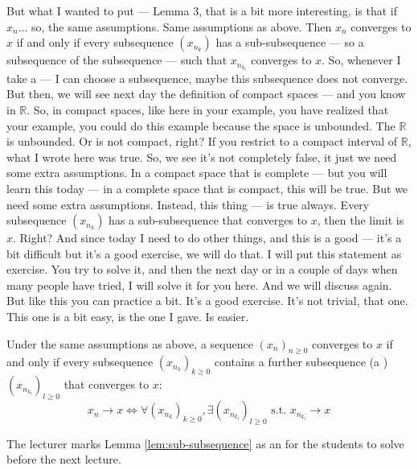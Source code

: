 \begin{spoken-clean}[00:13:41 - 00:15:50]
But what I wanted to put — Lemma 3, that is a bit more interesting, is that if $x_n$... so, the same assumptions. Same assumptions as above. Then $x_n$ converges to $x$ if and only if every subsequence $(x_{n_k})$ has a sub-subsequence — so a subsequence of the subsequence — such that $x_{n_{k_l}}$ converges to $x$. So, whenever I take a — I can choose a subsequence, maybe this subsequence does not converge. But then, we will see next day the definition of compact spaces — and you know in $\mathbb{R}$. So, in compact spaces, like here in your example, you have realized that your example, you could do this example because the space is unbounded. The $\mathbb{R}$ is unbounded. Or is not compact, right? If you restrict to a compact interval of $\mathbb{R}$, what I wrote here was true. So, we see it's not completely false, it just we need some extra assumptions. In a compact space that is complete — but you will learn this today — in a complete space that is compact, this will be true. But we need some extra assumptions. Instead, this thing — is true always. Every subsequence $(x_{n_k})$ has a sub-subsequence that converges to $x$, then the limit is $x$. Right? And since today I need to do other things, and this is a good — it's a bit difficult but it's a good exercise, we will do that. I will put this statement as exercise. You try to solve it, and then the next day or in a couple of days when many people have tried, I will solve it for you here. And we will discuss again. But like this you can practice a bit. It's a good exercise. It's not trivial, that one. This one is a bit easy, is the one I gave. Is easier.
\end{spoken-clean}

\begin{math-stroke}
\begin{lemma*}\label{lem:sub-subsequence}
Under the same assumptions as above, a sequence $(x_n)_{n \ge 0}$ converges to $x$ if and only if every subsequence $(x_{n_k})_{k \ge 0}$ contains a further subsequence (a ) $(x_{n_{k_l}})_{l \ge 0}$ that converges to $x$:
\[ x_n \to x \iff \forall (x_{n_k})_{k \ge 0}, \exists (x_{n_{k_l}})_{l \ge 0} \text{ s.t. } x_{n_{k_l}} \to x \]
\end{lemma*}
\end{math-stroke}

\begin{nice-box}[Exercise]
The lecturer marks Lemma \ref{lem:sub-subsequence} as an  for the students to solve before the next lecture.
\end{nice-box}

